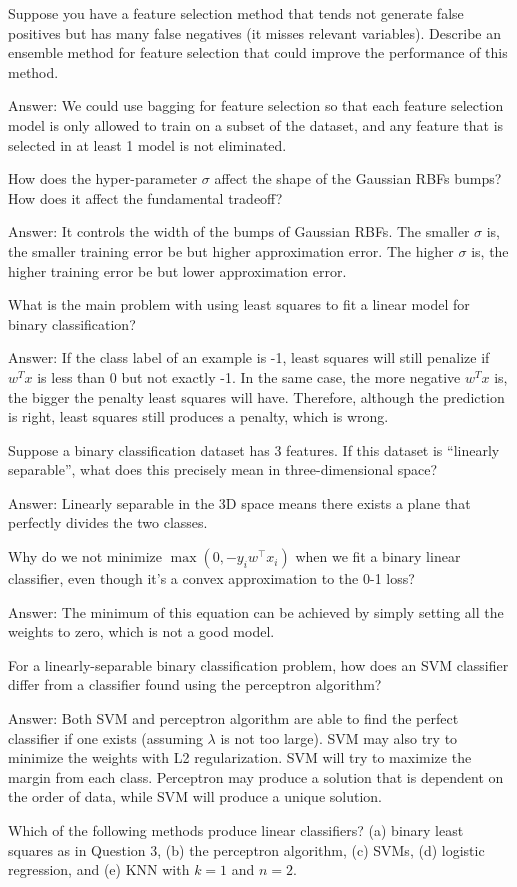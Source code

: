 \documentclass{article}
\def\ans#1{\par\gre{Answer: #1}}
\def\gre#1{{\color{gre}#1}}
\begin{document}
{\item Suppose you have a feature selection method that tends not generate false positives but has many false negatives (it misses relevant variables). Describe an ensemble method for feature selection that could improve the performance of this method.
\ans{We could use bagging for feature selection so that each feature selection model is only allowed to train on a subset of the dataset, and any feature that is selected in at least 1 model is not eliminated.}
\item How does the hyper-parameter $\sigma$ affect the shape of the Gaussian RBFs bumps? How does it affect the fundamental tradeoff?
\ans{It controls the width of the bumps of Gaussian RBFs. The smaller $\sigma$ is, the smaller training error be but higher approximation error. The higher $\sigma$ is, the higher training error be but lower approximation error.}
\item What is the main problem with using least squares to fit a linear model for binary classification?
\ans{If the class label of an example is -1, least squares will still penalize if $w^Tx$ is less than 0 but not exactly -1. In the same case, the more negative $w^Tx$ is, the bigger the penalty least squares will have. Therefore, although the prediction is right, least squares still produces a penalty, which is wrong. }
\item Suppose a binary classification dataset has 3 features. If this dataset is ``linearly separable'', what does this precisely mean in three-dimensional space?
\ans{Linearly separable in the 3D space means there exists a plane that perfectly divides the two classes.}
\item Why do we not minimize $\max(0, -y_i w^\top x_i)$ when we fit a binary linear classifier, even though it’s a convex approximation to the 0-1 loss?
\ans{The minimum of this equation can be achieved by simply setting all the weights to zero, which is not a good model.}
\item For a linearly-separable binary classification problem, how does an SVM classifier differ from a classifier found using the perceptron algorithm?
\ans{Both SVM and perceptron algorithm are able to find the perfect classifier if one exists (assuming $\lambda$ is not too large). SVM may also try to minimize the weights with L2 regularization. SVM will try to maximize the margin from each class. Perceptron may produce a solution that is dependent on the order of data, while SVM will produce a unique solution.}
\item Which of the following methods produce linear classifiers? (a) binary least squares as in Question 3, (b) the perceptron algorithm, (c) SVMs, (d) logistic regression, and (e) KNN with $k=1$ and $n=2$.
}
\end{document}
